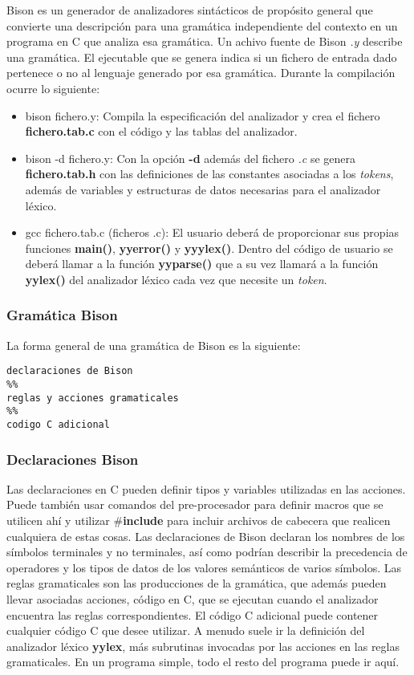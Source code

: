 Bison es un generador de analizadores sintácticos de propósito general que convierte una descripción para una gramática independiente del contexto en un programa en C que analiza esa gramática. Un achivo fuente de Bison \textit{.y} describe una gramática. El ejecutable que se genera indica si un fichero de entrada dado pertenece o no al lenguaje generado por esa gramática. Durante la compilación ocurre lo siguiente:

\begin{itemize}
\item bison fichero.y: Compila la especificación del analizador y crea el fichero \textbf{fichero.tab.c} con el código y las tablas del analizador.
\item bison -d fichero.y: Con la opción \textbf{-d} además del fichero \textit{.c} se genera \textbf{fichero.tab.h} con las definiciones de las constantes asociadas a los \textit{tokens}, además de variables y estructuras de datos necesarias para el analizador léxico.
\item gcc fichero.tab.c (ficheros .c): El usuario deberá de proporcionar sus propias funciones \textbf{main()}, \textbf{yyerror()} y \textbf{yyylex()}. Dentro del código de usuario se deberá llamar a la función \textbf{yyparse()} que a su vez llamará a la función \textbf{yylex()} del analizador léxico cada vez que necesite un \textit{token}.
\end{itemize}

\subsubsection{Gramática Bison}

La forma general de una gramática de Bison es la siguiente:

\begin{lstlisting}
declaraciones de Bison
%%
reglas y acciones gramaticales
%%
codigo C adicional
\end{lstlisting}

\subsubsection{Declaraciones Bison}

Las declaraciones en C pueden definir tipos y variables utilizadas en las acciones. Puede también usar comandos del pre-procesador para definir macros que se utilicen ahí y utilizar \textbf{$\#$include} para incluir archivos de cabecera que realicen cualquiera de estas cosas. Las declaraciones de Bison declaran los nombres de los símbolos terminales y no terminales, así como podrían describir la precedencia de operadores y los tipos de datos de los valores semánticos de varios símbolos. Las reglas gramaticales son las producciones de la gramática, que además pueden llevar asociadas acciones, código en C, que se ejecutan cuando el analizador encuentra las reglas correspondientes. El código C adicional puede contener cualquier código C que desee utilizar. A menudo suele ir la definición del analizador léxico \textbf{yylex}, más subrutinas invocadas por las acciones en las reglas gramaticales. En un programa simple, todo el resto del programa puede ir aquí.

